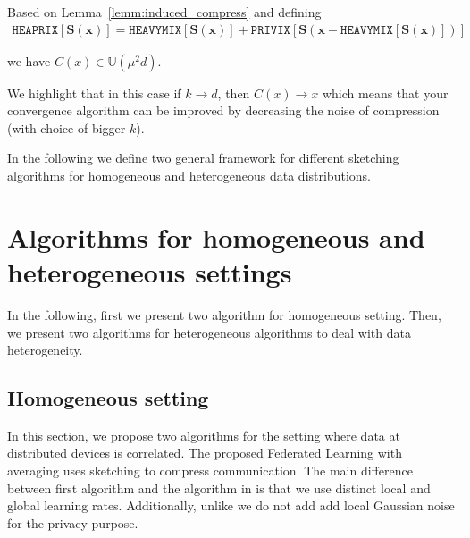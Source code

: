 \begin{corollary}
Based on Lemma~\ref{lemm:induced_compress} and defining 
\begin{align}
    \texttt{HEAPRIX}\left[\mathbf{S}\left(\boldsymbol{x}\right)\right]=\texttt{HEAVYMIX}\left[\mathbf{S}\left(\mathbf{x}\right)\right]+\texttt{PRIVIX}\left[\mathbf{S}\left(\mathbf{x}-\texttt{HEAVYMIX}\left[\mathbf{S}\left(\mathbf{x}\right)\right]\right)\right]
\end{align}

we have $C(x)\in \mathbb{U}(\mu^2 d)$.
\end{corollary}
\begin{remark}
We highlight that in this case if $k\rightarrow d$, then $C(x)\rightarrow x$ which means that your convergence algorithm can be improved by decreasing the noise of compression (with choice of bigger $k$). 
\end{remark}

In the following we define two general framework for different sketching algorithms for homogeneous and heterogeneous data distributions.
\section{Algorithms for homogeneous and heterogeneous settings}
In the following, first we present two algorithm for homogeneous setting. Then, we present two algorithms for heterogeneous algorithms to deal with data heterogeneity.   

\subsection{Homogeneous setting}
In this section, we propose two algorithms for the setting where data at distributed devices is  correlated. The proposed Federated Learning with averaging uses sketching to compress communication. The main difference between first algorithm and the algorithm in \cite{li2019privacy} is that we use distinct local and global learning rates. Additionally, unlike \cite{li2019privacy} we do not add add local Gaussian noise for the privacy purpose. 

